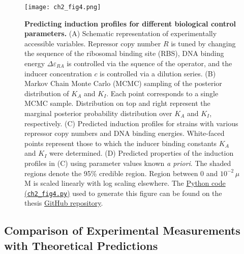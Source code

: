 \documentclass[12pt]{caltech_thesis}
\begin{document}
\hypertarget{fig:induction_predictions}{%
\begin{figure}
\centering
\texttt{[image: ch2\_fig4.png]}
\caption[{Predicting induction profiles for different biological control
parameters.}]{\textbf{Predicting induction profiles for different
biological control parameters.} (A) Schematic representation of
experimentally accessible variables. Repressor copy number \(R\) is
tuned by changing the sequence of the ribosomal binding site (RBS), DNA
binding energy \(\Delta\varepsilon_{RA}\) is controlled via the squence
of the operator, and the inducer concentration \(c\) is controlled via a
dilution series. (B) Markov Chain Monte Carlo (MCMC) sampling of the
posterior distribution of \(K_A\) and \(K_I\). Each point corresponds to
a single MCMC sample. Distribution on top and right represent the
marginal posterior probability distribution over \(K_A\) and \(K_I\),
respectively. (C) Predicted induction profiles for strains with various
repressor copy numbers and DNA binding energies. White-faced points
represent those to which the inducer binding constants \(K_A\) and
\(K_I\) were determined. (D) Predicted properties of the induction
profiles in (C) using parameter values known \emph{a priori}. The shaded
regions denote the 95\% credible region. Region between 0 and
\(10^{-2}\, \mu\)M is scaled linearly with log scaling elsewhere. The
\href{https://github.com/gchure/phd/blob/master/src/chapter_02/code/ch2_fig4.py}{Python
code (\texttt{ch2\_fig4.py})} used to generate this figure can be found
on the thesis \href{https://github.com/gchure/phd}{GitHub repository}.}
\label{fig:induction_predictions}
\end{figure}
}

\hypertarget{comparison-of-experimental-measurements-with-theoretical-predictions}{%
\subsection{Comparison of Experimental Measurements with Theoretical
Predictions}\label{comparison-of-experimental-measurements-with-theoretical-predictions}}
\end{document}
